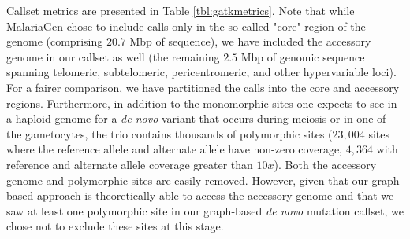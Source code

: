 Callset metrics are presented in Table \ref{tbl:gatkmetrics}.  Note that while MalariaGen chose to include calls only in the so-called "core" region of the genome (comprising $20.7$ Mbp of sequence), we have included the accessory genome in our callset as well (the remaining $2.5$ Mbp of genomic sequence spanning telomeric, subtelomeric, pericentromeric, and other hypervariable loci).  For a fairer comparison, we have partitioned the calls into the core and accessory regions.  Furthermore, in addition to the monomorphic sites one expects to see in a haploid genome for a \textit{de novo} variant that occurs during meiosis or in one of the gametocytes, the trio contains thousands of polymorphic sites ($23,004$ sites where the reference allele and alternate allele have non-zero coverage, $4,364$ with reference and alternate allele coverage greater than $10x$).  Both the accessory genome and polymorphic sites are easily removed.  However, given that our graph-based approach is theoretically able to access the accessory genome and that we saw at least one polymorphic site in our graph-based \textit{de novo} mutation callset, we chose not to exclude these sites at this stage.

